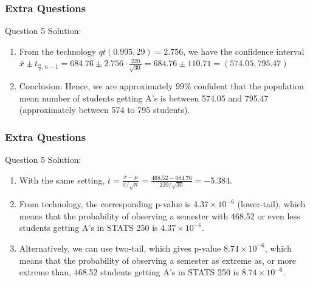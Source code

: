 \documentclass{beamer}
\begin{document}

\begin{frame}
\frametitle{Extra Questions}
\begin{block}{Question 5 Solution:}

\begin{enumerate}

\item From the technology $qt(0.995, 29) = 2.756$, we have the confidence interval $\bar x \pm t_{\frac{\alpha}{2},n-1} = 684.76 \pm 2.756 \cdot \frac{220}{\sqrt{30}} = 684.76 \pm 110.71 = (574.05, 795.47)$

\item Conclusion: Hence, we are approximately $99 \%$ confident that the population mean number of students getting A's is between 574.05 and 795.47 (approximately between 574 to 795 students).

\end{enumerate}
\end{block}
\end{frame}

\begin{frame}
\frametitle{Extra Questions}
\begin{block}{Question 5 Solution:}

\begin{enumerate}

\item With the same setting, $t = \frac{\bar x - \mu}{\sigma/\sqrt{n}} = \frac{468.52 - 684.76}{220/\sqrt{30}} = -5.384$.

\item From technology, the corresponding p-value is $4.37 \times 10^{-6}$ (lower-tail), which means that the probability of observing a semester with 468.52 or even less students getting A's in STATS 250 is $4.37 \times 10^{-6}$.

\item Alternatively, we can use two-tail, which gives p-value $8.74 \times 10^{-6}$, which means that the probability of observing a semester as extreme as, or more extreme than, 468.52 students getting A's in STATS 250 is $8.74 \times 10^{-6}$.

\end{enumerate}
\end{block}
\end{frame}

\end{document}

